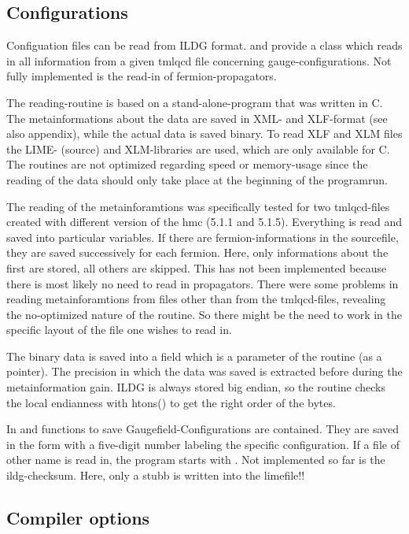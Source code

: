 \subsection{Configurations}
Configuation files can be read from ILDG format.  and  provide a class  which reads in all information from a given tmlqcd file concerning gauge-configurations. Not fully implemented is the read-in of fermion-propagators. 

The reading-routine is based on a stand-alone-program that was written in C. The metainformations about the data are saved in XML- and XLF-format (see also appendix), while the actual data is saved binary. To read XLF and XLM files the LIME- (source) and XLM-libraries are used, which are only available for C. The routines are not optimized regarding speed or memory-usage since the reading of the data should only take place at the beginning of the programrun.

The reading of the metainforamtions was specifically tested for two tmlqcd-files created with different version of the hmc (5.1.1 and 5.1.5). Everything is read and saved into particular variables. If there are fermion-informations in the sourcefile, they are saved successively for each fermion. Here, only informations about the first are stored, all others are skipped. This has not been implemented because there is most likely no need to read in propagators. There were some problems in reading metainforamtions from files other than from the tmlqcd-files, revealing the no-optimized nature of the routine. So there might be the need to work in the specific layout of the file one wishes to read in.

The binary data is saved into a field which is a parameter of the routine (as a pointer). The precision in which the data was saved is extracted before during the metainformation gain. ILDG is always stored big endian, so the routine checks the local endianness with htons() to get the right order of the bytes.

In  and  functions to save Gaugefield-Configurations are contained. They are saved in the form  with a five-digit number labeling the specific configuration. If a file of other name is read in, the program starts with . Not implemented so far is the ildg-checksum. Here, only a stubb is written into the limefile!!


\subsection{Compiler options}
